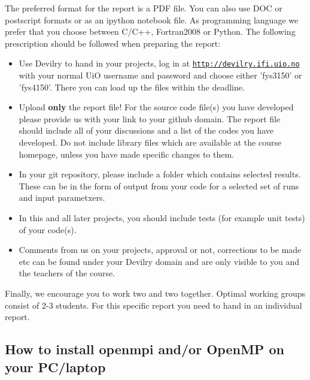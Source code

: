 \documentclass[%
oneside,                 %
final,                   %
10pt]{article}
\begin{document}
The preferred format for the report is a PDF file. You can also use DOC or postscript formats or as an ipython notebook file.  As programming language we prefer that you choose between C/C++, Fortran2008 or Python. The following prescription should be followed when preparing the report:

\begin{itemize}
  \item Use Devilry to hand in your projects, log in  at  \href{{http://devilry.ifi.uio.no}}{\nolinkurl{http://devilry.ifi.uio.no}} with your normal UiO username and password and choose either 'fys3150' or 'fys4150'. There you can load up the files within the deadline.

  \item Upload \textbf{only} the report file!  For the source code file(s) you have developed please provide us with your link to your github domain.  The report file should include all of your discussions and a list of the codes you have developed.  Do not include library files which are available at the course homepage, unless you have made specific changes to them.

  \item In your git repository, please include a folder which contains selected results. These can be in the form of output from your code for a selected set of runs and input parametxers.

  \item In this and all later projects, you should include tests (for example unit tests) of your code(s).

  \item Comments  from us on your projects, approval or not, corrections to be made  etc can be found under your Devilry domain and are only visible to you and the teachers of the course.
\end{itemize}

\noindent
Finally, 
we encourage you to work two and two together. Optimal working groups consist of 
2-3 students. For this specific report you need to hand in an individual report.



\subsection*{How to install openmpi and/or OpenMP on your PC/laptop}
\end{document}
